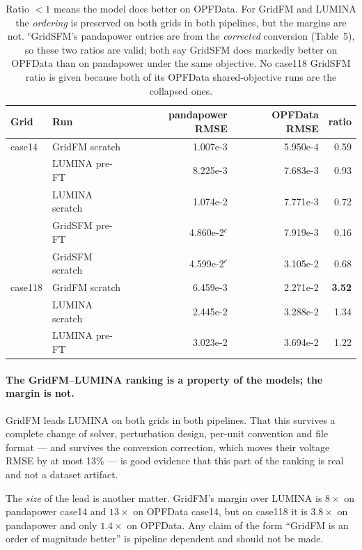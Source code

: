 \documentclass[10pt]{article}
\begin{document}
\begin{table}[H]
\centering
\small
\begin{tabular}{llrrr}
\toprule
Grid & Run & pandapower RMSE & OPFData RMSE & ratio \\
\midrule
case14 & GridFM scratch  & 1.007e-3 & 5.950e-4 & 0.59 \\
       & LUMINA pre-FT   & 8.225e-3 & 7.683e-3 & 0.93 \\
       & LUMINA scratch  & 1.074e-2 & 7.771e-3 & 0.72 \\
       & GridSFM pre-FT  & 4.860e-2$^{c}$ & 7.919e-3 & 0.16 \\
       & GridSFM scratch & 4.599e-2$^{c}$ & 3.105e-2 & 0.68 \\
\midrule
case118 & GridFM scratch & 6.459e-3 & 2.271e-2 & \textbf{3.52} \\
        & LUMINA scratch & 2.445e-2 & 3.288e-2 & 1.34 \\
        & LUMINA pre-FT  & 3.023e-2 & 3.694e-2 & 1.22 \\
\bottomrule
\end{tabular}
\label{tab:cross}
\caption{Ratio \(<1\) means the model does better on OPFData. For
GridFM and LUMINA the \emph{ordering} is preserved on both grids in both
pipelines, but the margins are not. $^{c}$GridSFM's pandapower entries are from
the \emph{corrected} conversion (Table~5), so these two ratios are valid; both
say GridSFM does markedly better on OPFData than on pandapower under the same
objective. No case118 GridSFM ratio is given because both of its OPFData
shared-objective runs are the collapsed ones.}
\end{table}

\paragraph{The GridFM--LUMINA ranking is a property of the models; the margin is
not.} GridFM leads LUMINA on both grids in both pipelines. That this survives a
complete change of solver, perturbation design, per-unit convention and file
format --- and survives the conversion correction, which moves their voltage
RMSE by at most 13\% --- is good evidence that this part of the ranking is real
and not a dataset artifact.

The \emph{size} of the lead is another matter. GridFM's margin over LUMINA is
\(8\times\) on pandapower case14 and \(13\times\) on OPFData case14, but on
case118 it is \(3.8\times\) on pandapower and only \(1.4\times\) on OPFData. Any
claim of the form ``GridFM is an order of magnitude better'' is pipeline
dependent and should not be made.
\end{document}
